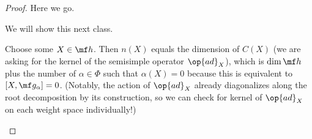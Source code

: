 \documentclass[../notes.tex]{subfiles}
\begin{document}
\begin{proof}
	Here we go.
	\begin{listalph}
		\item We will show this next class.
		\item Choose some $X\in\mf h$. Then $n(X)$ equals the dimension of $C(X)$ (we are asking for the kernel of the semisimple operator $\op{ad}_X$), which is $\dim\mf h$ plus the number of $\alpha\in\Phi$ such that $\alpha(X)=0$ because this is equivalent to $[X,\mf g_\alpha]=0$. (Notably, the action of $\op{ad}_X$ already diagonalizes along the root decomposition by its construction, so we can check for kernel of $\op{ad}_X$ on each weight space individually!)
		\qedhere
	\end{listalph}
\end{proof}
\end{document}
